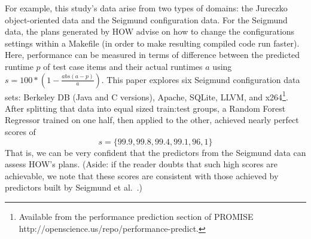 \documentclass[conference]{IEEEtran}
\begin{document}
For example, this study's data arise from two types of domains: the Jureczko   object-oriented data  
and the Seigmund configuration data. 
For the Seigmund data, the plans generated by HOW advise on how  to change the   configurations settings within a Makefile
(in order to make resulting compiled
code  run faster). Here, performance can be measured in terms of  difference
between the predicted runtime $p$ of test case items and their actual runtimes $a$
using  $s= 100*(1- \frac{abs(a - p)}{a})$.
This paper  explores    six Seigmund configuration data sets:  Berkeley DB (Java and C versions), Apache, SQLite, LLVM, and
  x264\footnote{Available from the performance prediction section of PROMISE
  http://openscience.us/repo/performance-predict.}. 
  After splitting that data into equal sized train:test groups, a Random Forest
  Regressor trained on one half, then applied to the other, achieved nearly perfect scores of
\[s=\{99.9, 99.8, 99.4, 99.1, 96,1\}\]
That is, we can be very confident that the predictors from the Seigmund data can assess
HOW's plans.
(Aside: if the reader doubts that such high scores are achievable, we note that these scores are 
consistent with those achieved by predictors built by Seigmund et al.~\cite{sven12}.)
\end{document}
